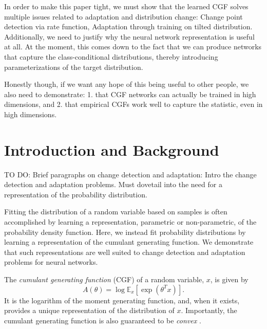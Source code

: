 \documentclass[11pt]{article}      %
\begin{document}
In order to make this paper tight, we must show that the learned CGF solves multiple issues related to adaptation and distribution change: Change point detection via rate function, Adaptation through training on tilted distribution.
Additionally, we need to justify why the neural network representation is useful at all.
At the moment, this comes down to the fact that we can produce networks that capture the class-conditional distributions, thereby introducing parameterizations of the target distribution.

Honestly though, if we want any hope of this being useful to other people, we also need to demonstrate: 1. that CGF networks can actually be trained in high dimensions, and 2. that empirical CGFs work well to capture the statistic, even in high dimensions.


\section{Introduction and Background}


TO DO: Brief paragraphs on change detection and adaptation: Intro the change detection and adaptation problems.
Must dovetail into the need for a representation of the probability distribution.


Fitting the distribution of a random variable based on samples is often accomplished by learning a representation, parametric or non-parametric, of the probability density function.
Here, we instead fit probability distributions by learning a representation of the cumulant generating function.
We demonstrate that such representations are well suited to change detection and adaptation problems for neural networks.

The \textit{cumulant generating function} (CGF) of a random variable, $x$, is given by
\begin{equation}
  A(\theta) = \log \mathbb{E}_x[\exp(\theta^T x)]. \label{def:cgf}
\end{equation}
It is the logarithm of the moment generating function, and, when it exists, provides a unique representation of the distribution of $x$.
Importantly, the cumulant generating function is also guaranteed to be \textit{convex} \cite{barndorff2014information}.
\end{document}
